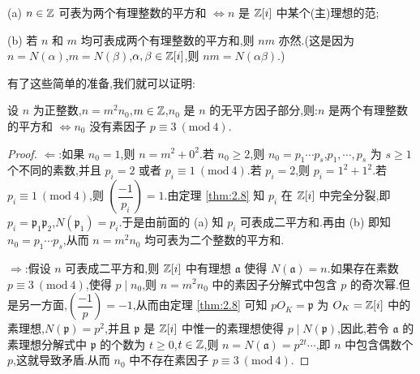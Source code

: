 (a) $n\in\mathbb{Z}$ 可表为两个有理整数的平方和 $\Leftrightarrow n$ 是 $\mathbb{Z}[i]$ 中某个(主)理想的范;

(b) 若 $n$ 和 $m$ 均可表成两个有理整数的平方和,则 $nm$ 亦然.(这是因为 $n=N(\alpha)$,$m=N(\beta)$,$\alpha,\beta\in\mathbb{Z}[i]$,则 $nm=N(\alpha\beta)$.)

有了这些简单的准备,我们就可以证明:

\begin{theorem}\label{thm:2.9}
设 $n$ 为正整数,$n=m^2n_0$,$m\in\mathbb{Z}$,$n_0$ 是 $n$ 的无平方因子部分,则:$n$ 是两个有理整数的平方和 $\Leftrightarrow n_0$ 没有素因子 $p\equiv 3\ (\mathrm{mod}\ 4)$.
\end{theorem}

\begin{proof}
$\Leftarrow$:如果 $n_0=1$,则 $n=m^2+0^2$.若 $n_0\geqslant 2$,则 $n_0=p_1\cdots p_s$,$p_1,\cdots,p_s$ 为 $s\geqslant 1$ 个不同的素数,并且 $p_i=2$ 或者 $p_i\equiv 1\ (\mathrm{mod}\ 4)$.若 $p_i=2$,则 $p_i=1^2+1^2$.若 $p_i\equiv 1\ (\mathrm{mod}\ 4)$,则 $\left(\dfrac{-1}{p_i}\right)=1$.由定理 \ref{thm:2.8} 知 $p_i$ 在 $\mathbb{Z}[i]$ 中完全分裂,即 $p_i=\mathfrak{p}_1\mathfrak{p}_2$,$N(\mathfrak{p}_1)=p_i$.于是由前面的 (a) 知 $p_i$ 可表成二平方和.再由 (b) 即知 $n_0=p_1\cdots p_s$,从而 $n=m^2n_0$ 均可表为二个整数的平方和.

$\Rightarrow$:假设 $n$ 可表成二平方和,则 $\mathbb{Z}[i]$ 中有理想 $\mathfrak{a}$ 使得 $N(\mathfrak{a})=n$.如果存在素数 $p\equiv 3\ (\mathrm{mod}\ 4)$,使得 $p\mid n_0$,则 $n=m^2n_0$ 中的素因子分解式中包含 $p$ 的奇次幂.但是另一方面,$\left(\dfrac{-1}{p}\right)=-1$,从而由定理 \ref{thm:2.8} 可知 $pO_K=\mathfrak{p}$ 为 $O_K=\mathbb{Z}[i]$ 中的素理想,$N(\mathfrak{p})=p^2$,并且 $\mathfrak{p}$ 是 $\mathbb{Z}[i]$ 中惟一的素理想使得 $p\mid N(\mathfrak{p})$,因此,若令 $\mathfrak{a}$ 的素理想分解式中 $\mathfrak{p}$ 的个数为 $t\geqslant 0$,$t\in\mathbb{Z}$,则 $n=N(\mathfrak{a})=p^{2t}\cdots$,即 $n$ 中包含偶数个 $p$,这就导致矛盾.从而 $n_0$ 中不存在素因子 $p\equiv 3\ (\mathrm{mod}\ 4)$.
\end{proof}

